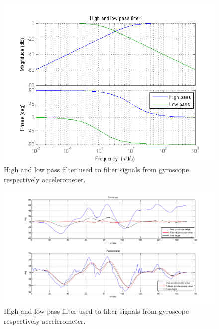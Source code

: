 \documentclass[a4paper]{article}
\begin{document}
\begin{figure}[H]
  \centering
\includegraphics[scale=0.8]{pic/HP_LP.png}
\caption{High and low pass filter used to filter signals from gyroscope respectively accelerometer.}
\end{figure}

\begin{figure}[H]
  \centering
\includegraphics[scale=0.4]{pic/HP_LP_in_action.png}
\caption{High and low pass filter used to filter signals from gyroscope respectively accelerometer.}
\end{figure}
\end{document}
